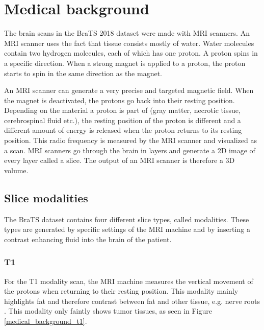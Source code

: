\section{Medical background}
The brain scans in the BraTS\cite{menze2015multimodal} 2018 dataset were made with MRI scanners\cite{mriscanner}. 
An MRI scanner uses the fact that tissue consists mostly of water. Water molecules contain two hydrogen molecules,
each of which has one proton. A proton spins in a specific direction. When a strong magnet is applied to a proton, the proton starts to spin in the same direction as the magnet. 

An MRI scanner can generate a very precise and targeted magnetic field. When the magnet is deactivated, the protons go back into their resting position. Depending on the material a proton is part of (gray matter, necrotic tissue, cerebrospinal fluid  etc.), the resting position of the proton is different and a different amount of energy is released when the proton returns to its resting position. This radio frequency is measured by the MRI scanner and visualized as a scan. MRI scanners go through the brain in layers and generate a 2D image of every layer called a slice. The output of an MRI scanner is therefore a 3D volume.

\subsection{Slice modalities}
The BraTS dataset contains four different slice types, called modalities. These types are generated by specific settings of the MRI machine and by inserting a contrast enhancing fluid into the brain of the patient.

\subsubsection{T1}
For the T1 modality scan, the MRI machine measures the vertical movement of the protons when returning to their resting position. This modality mainly highlights fat and therefore contrast between fat and other tissue, e.g. nerve roots \cite{mriquora}. This modality only faintly shows tumor tissues, as seen in Figure \ref{medical_background_t1}.

